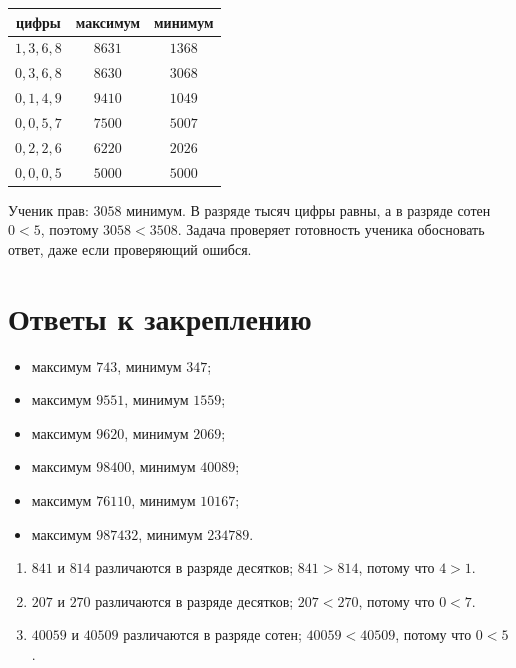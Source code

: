 \newpage
\begin{teacherbox}[Задание 3]
  \begin{center}
  \renewcommand{\arraystretch}{1.35}
  \begin{tabular}{c|c|c}
    цифры & максимум & минимум \\
    \hline
    \(1,3,6,8\) & \(8631\) & \(1368\) \\
    \(0,3,6,8\) & \(8630\) & \(3068\) \\
    \(0,1,4,9\) & \(9410\) & \(1049\) \\
    \(0,0,5,7\) & \(7500\) & \(5007\) \\
    \(0,2,2,6\) & \(6220\) & \(2026\) \\
    \(0,0,0,5\) & \(5000\) & \(5000\)
  \end{tabular}
  \end{center}
\end{teacherbox}

\begin{warningbox}[Ловушка с \(3058\)]
  Ученик прав: \(3058\) \textemdash{} минимум. В разряде тысяч цифры равны, а в разряде
  сотен \(0<5\), поэтому \(3058<3508\). Задача проверяет готовность ученика
  обосновать ответ, даже если проверяющий ошибся.
\end{warningbox}

\newpage
\section{Ответы к закреплению}

\begin{teacherbox}[Задание 4]
  \begin{itemize}
    \item максимум \(743\), минимум \(347\);
    \item максимум \(9551\), минимум \(1559\);
    \item максимум \(9620\), минимум \(2069\);
    \item максимум \(98400\), минимум \(40089\);
    \item максимум \(76110\), минимум \(10167\);
    \item максимум \(987432\), минимум \(234789\).
  \end{itemize}
\end{teacherbox}

\begin{teacherbox}[Задание 5]
  \begin{enumerate}
    \item \(841\) и \(814\) различаются в разряде десятков; \(841>814\),
      потому что \(4>1\).
    \item \(207\) и \(270\) различаются в разряде десятков; \(207<270\),
      потому что \(0<7\).
    \item \(40059\) и \(40509\) различаются в разряде сотен;
      \(40059<40509\), потому что \(0<5\).
  \end{enumerate}
\end{teacherbox}

